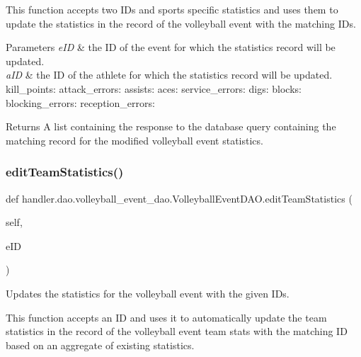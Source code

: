This function accepts two I\+Ds and sports specific statistics and uses them to update the statistics in the record of the volleyball event with the matching I\+Ds.


\begin{DoxyParams}{Parameters}
{\em e\+ID} & the ID of the event for which the statistics record will be updated. \\
\hline
{\em a\+ID} & the ID of the athlete for which the statistics record will be updated. kill\+\_\+points\+: attack\+\_\+errors\+: assists\+: aces\+: service\+\_\+errors\+: digs\+: blocks\+: blocking\+\_\+errors\+: reception\+\_\+errors\+:\\
\hline
\end{DoxyParams}
\begin{DoxyReturn}{Returns}
A list containing the response to the database query containing the matching record for the modified volleyball event statistics. 
\end{DoxyReturn}
\mbox{\label{classhandler_1_1dao_1_1volleyball__event__dao_1_1_volleyball_event_d_a_o_ab6748767a12639d8eb5aa014ccb5ad81}} 
\subsubsection{\texorpdfstring{edit\+Team\+Statistics()}{editTeamStatistics()}}
{\footnotesize\ttfamily def handler.\+dao.\+volleyball\+\_\+event\+\_\+dao.\+Volleyball\+Event\+D\+A\+O.\+edit\+Team\+Statistics (\begin{DoxyParamCaption}\item[{}]{self,  }\item[{}]{e\+ID }\end{DoxyParamCaption})}



Updates the statistics for the volleyball event with the given I\+Ds. 

This function accepts an ID and uses it to automatically update the team statistics in the record of the volleyball event team stats with the matching ID based on an aggregate of existing statistics.


